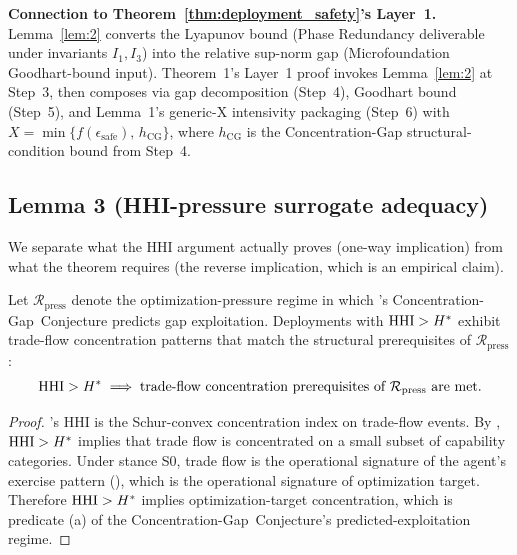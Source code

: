 \textbf{Connection to Theorem~\ref{thm:deployment_safety}'s Layer~1.}
Lemma~\ref{lem:2} converts the Lyapunov bound (Phase Redundancy
deliverable under invariants $I_1, I_3$) into the relative sup-norm
gap (Microfoundation Goodhart-bound input).  Theorem~1's Layer~1
proof invokes Lemma~\ref{lem:2} at Step~3, then composes via
gap decomposition (Step~4), Goodhart bound (Step~5), and Lemma~1's
generic-X intensivity packaging (Step~6) with
$X = \min\{f(\epsilon_{\mathrm{safe}}),\, h_{\mathrm{CG}}\}$,
where $h_{\mathrm{CG}}$ is the Concentration-Gap
structural-condition bound from Step~4.

\subsection{Lemma 3 (HHI-pressure surrogate adequacy)}
\label{sec:lem3}

We separate what the HHI argument actually proves (one-way
implication) from what the theorem requires (the reverse
implication, which is an empirical claim).

\begin{lemma}
\label{lem:3_forward}
Let $\mathcal{R}_{\mathrm{press}}$ denote the optimization-pressure regime in
    which \citep[Microfoundation]{lasser2026micro}'s
    Concentration-Gap~Conjecture predicts gap exploitation. Deployments with
    $\mathrm{HHI} > H^*$ exhibit trade-flow concentration patterns that match the
    structural prerequisites of $\mathcal{R}_{\mathrm{press}}$:
\[
  \mathrm{HHI} > H^* \;\Longrightarrow\;
  \text{trade-flow concentration prerequisites of }
  \mathcal{R}_{\mathrm{press}} \text{ are met}.
\]
\end{lemma}

\begin{proof}
\citep[Need~Sufficiency]{lasser2026paper8b}'s HHI is the Schur-convex concentration index on trade-flow
events. By
\citep[Schur-convexity property]{lasser2026paper8b}, $\mathrm{HHI} > H^*$
implies that trade flow is concentrated on a small subset of
capability categories. Under stance S0, trade flow is the
operational signature of the agent's exercise pattern (\citep[Revealed~Sacrifice]{lasser2026paper8a}),
which is the operational signature of optimization target.
Therefore $\mathrm{HHI} > H^*$ implies optimization-target concentration,
which is predicate (a) of the Concentration-Gap~Conjecture's predicted-exploitation
regime.
\end{proof}

